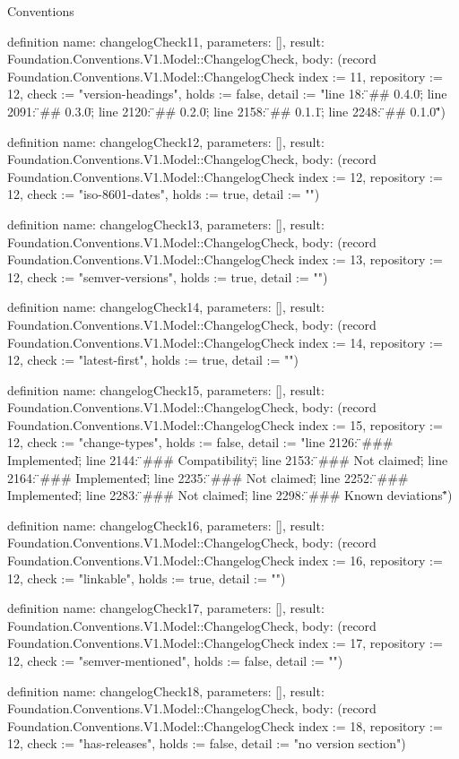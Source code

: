 \begin{lexlean}{Conventions}
\begin{semanticmodule}
definition{
  name: changelogCheck11,
  parameters: [],
  result: Foundation.Conventions.V1.Model::ChangelogCheck,
  body: (record Foundation.Conventions.V1.Model::ChangelogCheck {index := 11, repository := 12, check := "version-headings", holds := false, detail := "line 18: \"## 0.4.0\"; line 2091: \"## 0.3.0\"; line 2120: \"## 0.2.0\"; line 2158: \"## 0.1.1\"; line 2248: \"## 0.1.0\""})
}

definition{
  name: changelogCheck12,
  parameters: [],
  result: Foundation.Conventions.V1.Model::ChangelogCheck,
  body: (record Foundation.Conventions.V1.Model::ChangelogCheck {index := 12, repository := 12, check := "iso-8601-dates", holds := true, detail := ""})
}

definition{
  name: changelogCheck13,
  parameters: [],
  result: Foundation.Conventions.V1.Model::ChangelogCheck,
  body: (record Foundation.Conventions.V1.Model::ChangelogCheck {index := 13, repository := 12, check := "semver-versions", holds := true, detail := ""})
}

definition{
  name: changelogCheck14,
  parameters: [],
  result: Foundation.Conventions.V1.Model::ChangelogCheck,
  body: (record Foundation.Conventions.V1.Model::ChangelogCheck {index := 14, repository := 12, check := "latest-first", holds := true, detail := ""})
}

definition{
  name: changelogCheck15,
  parameters: [],
  result: Foundation.Conventions.V1.Model::ChangelogCheck,
  body: (record Foundation.Conventions.V1.Model::ChangelogCheck {index := 15, repository := 12, check := "change-types", holds := false, detail := "line 2126: \"### Implemented\"; line 2144: \"### Compatibility\"; line 2153: \"### Not claimed\"; line 2164: \"### Implemented\"; line 2235: \"### Not claimed\"; line 2252: \"### Implemented\"; line 2283: \"### Not claimed\"; line 2298: \"### Known deviations\""})
}

definition{
  name: changelogCheck16,
  parameters: [],
  result: Foundation.Conventions.V1.Model::ChangelogCheck,
  body: (record Foundation.Conventions.V1.Model::ChangelogCheck {index := 16, repository := 12, check := "linkable", holds := true, detail := ""})
}

definition{
  name: changelogCheck17,
  parameters: [],
  result: Foundation.Conventions.V1.Model::ChangelogCheck,
  body: (record Foundation.Conventions.V1.Model::ChangelogCheck {index := 17, repository := 12, check := "semver-mentioned", holds := false, detail := ""})
}

definition{
  name: changelogCheck18,
  parameters: [],
  result: Foundation.Conventions.V1.Model::ChangelogCheck,
  body: (record Foundation.Conventions.V1.Model::ChangelogCheck {index := 18, repository := 12, check := "has-releases", holds := false, detail := "no version section"})
}


\end{semanticmodule}
\end{lexlean}
